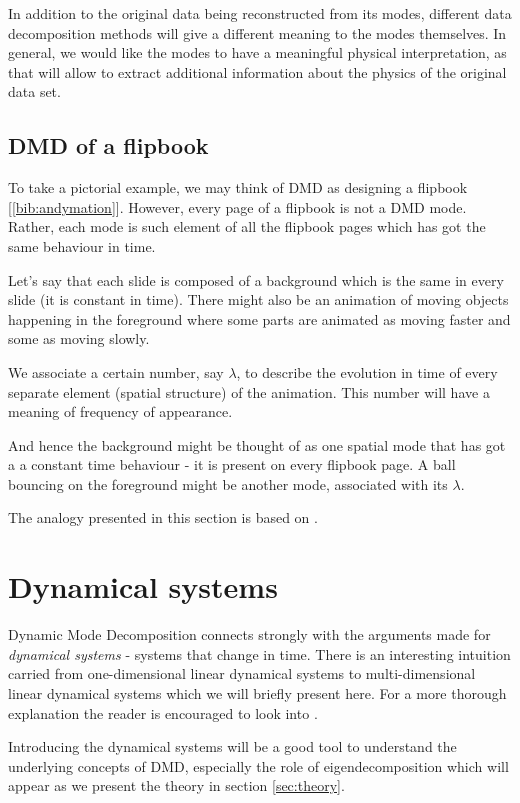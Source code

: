 \documentclass[10pt,twocolumn]{article}
\begin{document}
In addition to the original data being reconstructed from its modes, different data decomposition methods will give a different meaning to the modes themselves. In general, we would like the modes to have a meaningful physical interpretation, as that will allow to extract additional information about the physics of the original data set.

\subsection{DMD of a flipbook}

To take a pictorial example, we may think of DMD as designing a flipbook [\ref{bib:andymation}]. However, every page of a flipbook is not a DMD mode. Rather, each mode is such element of all the flipbook pages which has got the same behaviour in time.

Let's say that each slide is composed of a background which is the same in every slide (it is constant in time). There might also be an animation of moving objects happening in the foreground where some parts are animated as moving faster and some as moving slowly.

We associate a certain number, say $\lambda$, to describe the evolution in time of every separate element (spatial structure) of the animation. This number will have a meaning of frequency of appearance.

And hence the background might be thought of as one spatial mode that has got a a constant time behaviour - it is present on every flipbook page. A ball bouncing on the foreground might be another mode, associated with its $\lambda$. 

The analogy presented in this section is based on \cite{Grosek}.

\section{Dynamical systems}

Dynamic Mode Decomposition connects strongly with the arguments made for \textit{dynamical systems} - systems that change in time. There is an interesting intuition carried from one-dimensional linear dynamical systems to multi-dimensional linear dynamical systems which we will briefly present here. For a more thorough explanation the reader is encouraged to look into \cite{Prof_Edward_Scheinerman}. 

Introducing the dynamical systems will be a good tool to understand the underlying concepts of DMD, especially the role of eigendecomposition which will appear as we present the theory in section \ref{sec:theory}.
\end{document}
